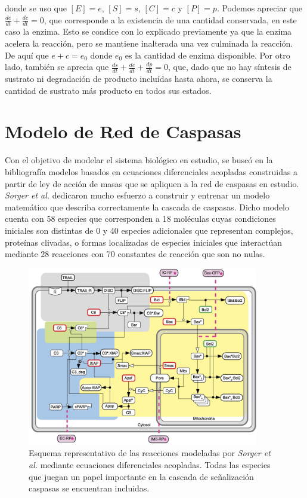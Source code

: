 \noindent donde se uso que $[E]=e$, $[S]=s$, $[C]=c$ y $[P]=p$. Podemos apreciar que $\frac{de}{dt} + \frac{dc}{dt} = 0$, que corresponde a la existencia de una cantidad conservada, en este caso la enzima. Esto se condice con lo explicado previamente ya que la enzima acelera la reacción, pero se mantiene inalterada una vez culminada la reacción. De aquí que $e+c=e_0$ donde $e_0$ es la cantidad de enzima disponible. Por otro lado, también se aprecia que $\frac{ds}{dt} + \frac{dc}{dt} + \frac{dp}{dt} = 0$, que, dado que no hay síntesis de sustrato ni degradación de producto incluídas hasta ahora, se conserva la cantidad de sustrato más producto en todos sus estados.


\section{Modelo de Red de Caspasas}

Con el objetivo de modelar el sistema biológico en estudio, se buscó en la bibliografía modelos basados en ecuaciones diferenciales acopladas construidas a partir de ley de acción de masas que se apliquen a la red de caspasas en estudio. \textit{Sorger et al.} dedicaron mucho esfuerzo a construir y entrenar un modelo matemático que describa correctamente la cascada de caspasas. Dicho modelo cuenta con 58 especies que corresponden a 18 moléculas cuyas condiciones iniciales son distintas de 0 y 40 especies adicionales que representan complejos, proteínas clivadas, o formas localizadas de especies iniciales que interactúan mediante 28 reacciones con 70 constantes de reacción que son no nulas\cite{Sorger2008}.

\begin{figure}
    \centering
    \includegraphics[width=0.9\textwidth]{./img/Cap3/ModeloCompleto.png}
    \caption{Esquema representativo de las reacciones modeladas por \textit{Sorger et al.} mediante ecuaciones diferenciales acopladas. Todas las especies que juegan un papel importante en la cascada de señalización caspasas se encuentran incluidas\cite{Albeck2008}.}
    \label{fig:ModeloCompleto}
\end{figure}

